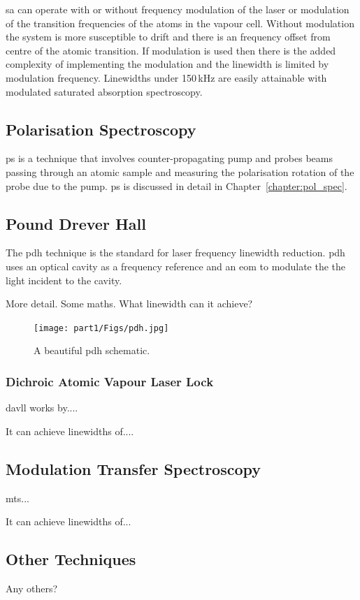 \Gls{sa} can operate with or without frequency modulation of the laser or modulation of the transition frequencies of the atoms in the vapour cell.
Without modulation the system is more susceptible to drift and there is an frequency offset from centre of the atomic transition.
If modulation is used then there is the added complexity of implementing the modulation and the linewidth is limited by modulation frequency.
Linewidths under 150\,kHz are easily attainable with modulated saturated absorption spectroscopy.

\subsection{Polarisation Spectroscopy}
\Gls{ps} is a technique that involves counter-propagating pump and probes beams passing through an atomic sample and measuring the polarisation rotation of the probe due to the pump. \Gls{ps} is discussed in detail in Chapter~\ref{chapter:pol_spec}.

\subsection{Pound Drever Hall}

The \gls{pdh} technique is the standard for laser frequency linewidth reduction.\cite{drever_laser_1983}
\gls{pdh} uses an optical cavity as a frequency reference and an \gls{eom} to modulate the the light incident to the cavity.

More detail. Some maths. What linewidth can it achieve?\cite{ludlow_compact_2007}

\begin{figure}
\centering
\texttt{[image: part1/Figs/pdh.jpg]}
\caption{A beautiful \gls{pdh} schematic.}
\end{figure}
\subsubsection{Dichroic Atomic Vapour Laser Lock}
\Gls{davll} works by....

It can achieve linewidths of....

\subsection{Modulation Transfer Spectroscopy}
\Gls{mts}...

It can achieve linewidths of...\cite{negnevitsky_wideband_2013}

\subsection{Other Techniques}

Any others?


